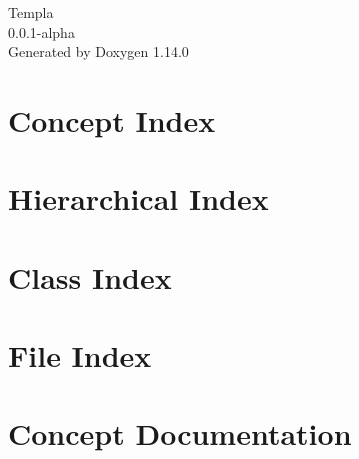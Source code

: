 \documentclass[twoside]{book}
\newcommand{\+}{\discretionary{\mbox{\scriptsize$\hookleftarrow$}}{}{}}
\newcommand{\clearemptydoublepage}{%
    \newpage{\pagestyle{empty}\cleardoublepage}%
  }
\begin{document}
  \raggedbottom
    \hypersetup{pageanchor=false,
                bookmarksnumbered=true,
                pdfencoding=unicode
               }
  \begin{titlepage}
  \vspace*{7cm}
  \begin{center}%
  {\Large Templa}\\
  [1ex]\large 0.\+0.\+1-\/alpha \\
  \vspace*{1cm}
  {\large Generated by Doxygen 1.14.0}\\
  \end{center}
  \end{titlepage}
  \clearemptydoublepage
  \tableofcontents
  \clearemptydoublepage
  \hypersetup{pageanchor=true}
\chapter{Concept Index}

\chapter{Hierarchical Index}

\chapter{Class Index}

\chapter{File Index}

\chapter{Concept Documentation}

















\end{document}
